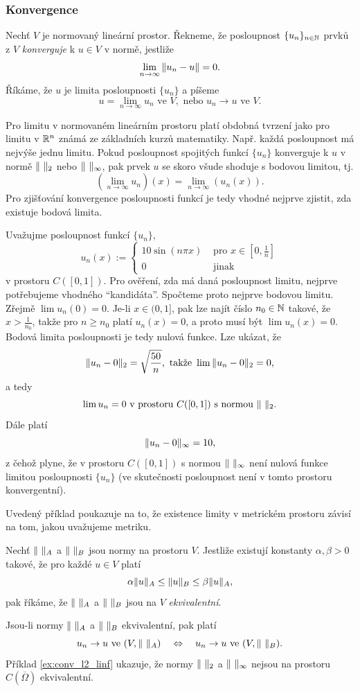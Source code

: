 \subsubsection{Konvergence}
% 
\begin{df}
Nechť $V$ je normovaný lineární prostor. Řekneme, že posloupnost $\{u_n\}_{n\in\mathbb N}$ prvků z $V$ \emph{konverguje} k $u\in V$ v normě, jestliže
\[ \lim_{n\rightarrow\infty} \|u_n-u\| = 0. \]
Říkáme, že $u$ je limita posloupnosti $\{u_n\}$ a píšeme
\[ u=\lim_{n\to\infty} u_n \mbox{ ve }V, \mbox{ nebo }u_n\to u \mbox{ ve }V. \]
\end{df}
% 
Pro limitu v normovaném lineárním prostoru platí obdobná tvrzení jako pro limitu v $\mathbb R^n$ známá ze základních kurzů matematiky.
Např. každá posloupnost má nejvýše jednu limitu.
Pokud posloupnost spojitých funkcí $\{u_n\}$ konverguje k $u$ v normě $\|\ \|_2$ nebo $\|\ \|_\infty$, pak prvek $u$ se skoro všude shoduje s bodovou limitou, tj.
\[ (\lim_{n\to\infty} u_n)(x) = \lim_{n\to\infty} (u_n(x)). \]
Pro zjišťování konvergence posloupnosti funkcí je tedy vhodné nejprve zjistit, zda existuje bodová limita.

\begin{ex}
\label{ex:conv_l2_linf}
Uvažujme posloupnost funkcí $\{u_n\}$,
\[ u_n(x) := \begin{cases}10\sin(n\pi x) & \mbox{ pro }x\in[0,\frac1n]\\0 & \mbox{ jinak}\end{cases} \]
v prostoru $C([0,1])$.
Pro ověření, zda má daná posloupnost limitu, nejprve potřebujeme vhodného ``kandidáta''.
Spočteme proto nejprve bodovou limitu.
Zřejmě $\lim u_n(0)=0$.
Je-li $x\in(0,1]$, pak lze najít číslo $n_0\in\mathbb N$ takové, že $x>\frac1{n_0}$, takže pro $n\ge n_0$ platí $u_n(x)=0$, a proto musí být $\lim u_n(x) = 0$.
Bodová limita posloupnosti je tedy nulová funkce.
Lze ukázat, že
\[ \|u_n-0\|_2 = \sqrt{\frac{50}n}, \mbox{ takže }\lim \|u_n-0\|_2=0, \]
a tedy
\[ \lim u_n = 0 \mbox{ v prostoru }C([0,1]) \mbox{ s normou }\|\ \|_2. \]
Dále platí
\[ \|u_n-0\|_\infty = 10, \]
z čehož plyne, že v prostoru $C([0,1])$ s normou $\|\ \|_\infty$ není nulová funkce limitou posloupnosti $\{u_n\}$ (ve skutečnosti posloupnost není v tomto prostoru konvergentní).
\end{ex}
% 
Uvedený příklad poukazuje na to, že existence limity v metrickém prostoru závisí na tom, jakou uvažujeme metriku.
\begin{df}
Nechť $\|\ \|_A$ a $\|\ \|_B$ jsou normy na prostoru $V$.
Jestliže existují konstanty $\alpha,\beta>0$ takové, že pro každé $u\in V$ platí
\[ \alpha\|u\|_A \le \|u\|_B \le \beta\|u\|_A, \]
pak říkáme, že $\|\ \|_A$ a $\|\ \|_B$ jsou na $V$ \emph{ekvivalentní}.
\end{df}
% 
Jsou-li normy $\|\ \|_A$ a $\|\ \|_B$ ekvivalentní, pak platí
\[ u_n\rightarrow u \mbox{ ve }(V,\|\ \|_A) \quad \Leftrightarrow \quad u_n\rightarrow u \mbox{ ve }(V,\|\ \|_B). \]
Příklad \ref{ex:conv_l2_linf} ukazuje, že normy $\|\ \|_2$ a $\|\ \|_\infty$ nejsou na prostoru $C(\overline\Omega)$ ekvivalentní.


